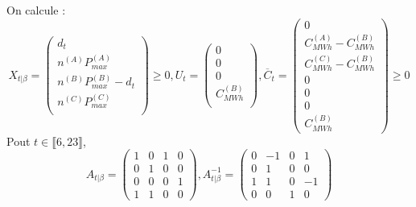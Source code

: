 \documentclass{article}
\begin{document}
On calcule :
$$
X_{t|\beta} = \left(
\begin{array}{c}
    d_t \\
    n^{(A)}P_{max}^{(A)} \\
    n^{(B)}P_{max}^{(B)} - d_t \\
    n^{(C)}P_{max}^{(C)} \\
\end{array}
\right)\geq 0
,
U_t = \left(
\begin{array}{c}
    0 \\
    0 \\
    0 \\
    C_{MWh}^{(B)} \\
\end{array}
\right),
\overline{C}_t=\left(
\begin{array}{c}
    0 \\
    C_{MWh}^{(A)} - C_{MWh}^{(B)} \\
    C_{MWh}^{(C)} - C_{MWh}^{(B)} \\
    0 \\
    0 \\
    0 \\
    C_{MWh}^{(B)}
\end{array}
\right)\geq 0
$$
Pout $t \in \llbracket 6,23 \rrbracket$,\\
$$
A_{t|\beta} = 
\left(
\begin{array}{cccc}
    1 & 0 & 1 & 0 \\
    0 & 1 & 0 & 0 \\
    0 & 0 & 0 & 1 \\
    1 & 1 & 0 & 0 
\end{array}
\right)
,
A_{t|\beta}^{-1} = 
\left(
\begin{array}{cccc}
    0 & -1 & 0 & 1 \\
    0 & 1 & 0 & 0 \\
    1 & 1 & 0 & -1 \\
    0 & 0 & 1 & 0 
\end{array}
\right)
$$
\end{document}
